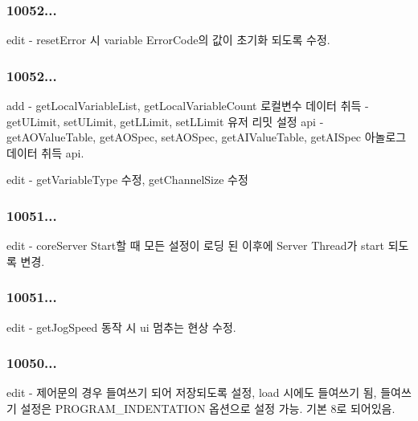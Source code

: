 \subsubsection*{10052...}

\begin{DoxyVerb}     edit - resetError 시 variable ErrorCode의 값이 초기화 되도록 수정.
\end{DoxyVerb}


\subsubsection*{10052...}

\begin{DoxyVerb}   add - getLocalVariableList, getLocalVariableCount 로컬변수 데이터 취득
       - getULimit,  setULimit, getLLimit, setLLimit 유저 리밋 설정 api
       - getAOValueTable, getAOSpec, setAOSpec, getAIValueTable, getAISpec 아놀로그 데이터 취득 api.

  edit - getVariableType 수정, getChannelSize 수정
\end{DoxyVerb}


\subsubsection*{10051...}

\begin{DoxyVerb}     edit - coreServer Start할 때 모든 설정이 로딩 된 이후에 Server Thread가 start 되도록 변경.
\end{DoxyVerb}


\subsubsection*{10051...}

\begin{DoxyVerb}     edit - getJogSpeed 동작 시 ui 멈추는 현상 수정.
\end{DoxyVerb}


\subsubsection*{10050...}

\begin{DoxyVerb}     edit - 제어문의 경우 들여쓰기 되어 저장되도록 설정, load 시에도 들여쓰기 됨, 들여쓰기 설정은
             PROGRAM_INDENTATION 옵션으로 설정 가능. 기본 8로 되어있음.
\end{DoxyVerb}


